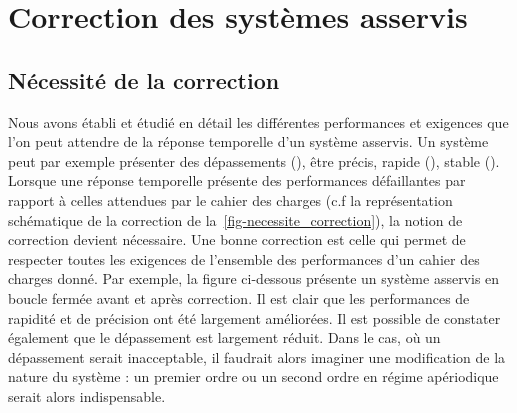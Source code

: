 \chapter{Correction des systèmes asservis\label{chap-correc}}
\minitoc
\newpage
\section{Nécessité de la correction}
Nous avons établi et étudié en détail les différentes performances et 
exigences que l'on peut attendre de la réponse temporelle d'un système asservis.
Un système peut par exemple présenter des dépassements 
(), être précis, rapide (), stable 
(). Lorsque une réponse temporelle présente des performances
défaillantes par rapport à celles attendues par le cahier des charges (c.f 
la représentation schématique de la correction de 
la~\cref{fig-necessite_correction}), la notion de correction devient 
nécessaire. Une bonne correction est celle qui permet de respecter toutes
les exigences de l'ensemble des performances d'un cahier des charges donné. 
Par exemple, la figure ci-dessous présente un système asservis 
en boucle fermée avant et après correction. Il est clair que les performances
de rapidité et de précision ont été largement améliorées. Il est possible de 
constater également que le dépassement est largement réduit. Dans le cas, 
où un dépassement serait inacceptable, il faudrait alors imaginer une 
modification de la nature du système : un premier ordre ou un second ordre
en régime apériodique serait alors indispensable.

